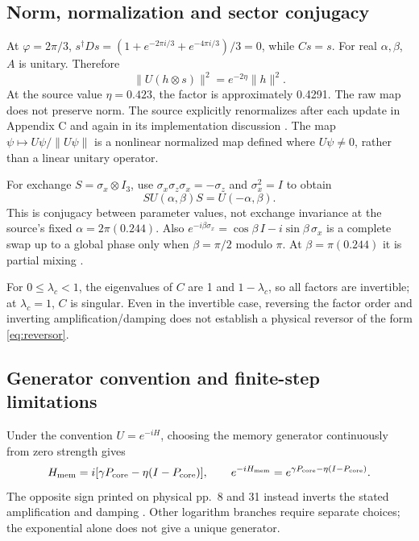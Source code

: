 \documentclass[11pt,a4paper]{article}
\theoremstyle{definition}
\numberwithin{equation}{section}
\begin{document}
\subsection{Norm, normalization and sector conjugacy}

At $\varphi=2\pi/3$, $s^\dagger Ds=(1+e^{-2\pi i/3}
+e^{-4\pi i/3})/3=0$, while $Cs=s$.
For real $\alpha,\beta$, $A$ is unitary. Therefore
\begin{equation}
 \|U(h\otimes s)\|^2=e^{-2\eta}\|h\|^2.
 \label{eq:finite-norm}
\end{equation}
At the source value $\eta=0.423$, the factor is approximately 0.4291.
The raw map does not preserve norm. The source explicitly renormalizes
after each update in Appendix C and again in its implementation discussion
\cite[physical pp.~24,44--45]{P15}.
The map $\psi\mapsto U\psi/\|U\psi\|$ is a nonlinear normalized map
defined where $U\psi\ne0$, rather than a linear unitary operator.

For exchange $S=\sigma_x\otimes I_3$, use
$\sigma_x\sigma_z\sigma_x=-\sigma_z$ and $\sigma_x^2=I$ to obtain
\begin{equation}
 SU(\alpha,\beta)S=U(-\alpha,\beta).
 \label{eq:finite-exchange}
\end{equation}
This is conjugacy between parameter values, not exchange invariance at
the source's fixed $\alpha=2\pi(0.244)$.
Also $e^{-i\beta\sigma_x}=\cos\beta\,I-i\sin\beta\,\sigma_x$
is a complete swap up to a global phase only when
$\beta=\pi/2$ modulo $\pi$. At $\beta=\pi(0.244)$ it is partial mixing
\cite[physical pp.~5--6]{P15}.

For $0\leq\lambda_c<1$, the eigenvalues of $C$ are 1 and
$1-\lambda_c$, so all factors are invertible; at $\lambda_c=1$,
$C$ is singular. Even in the invertible case, reversing the factor order
and inverting amplification/damping does not establish a physical
reversor of the form \eqref{eq:reversor}.

\subsection{Generator convention and finite-step limitations}

Under the convention $U=e^{-iH}$, choosing the memory generator
continuously from zero strength gives
\begin{equation}
 H_{\rm mem}=i[\gamma P_{\rm core}-\eta(I-P_{\rm core})],
 \qquad
 e^{-iH_{\rm mem}}=
 e^{\gamma P_{\rm core}-\eta(I-P_{\rm core})}.
 \label{eq:generator-memory}
\end{equation}
The opposite sign printed on physical pp.~8 and 31 instead inverts
the stated amplification and damping \cite[Appendix E.5]{P15}.
Other logarithm branches require separate choices; the exponential alone
does not give a unique generator.
\end{document}
